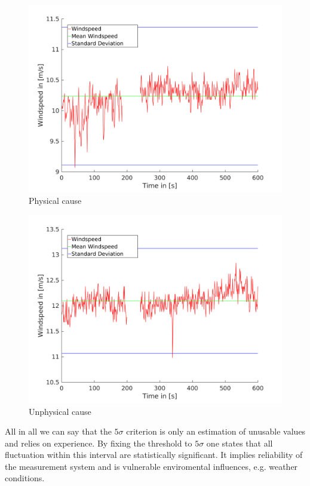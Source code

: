 \documentclass[10pt]{article}
\begin{document}
\begin{figure}[htb!]
  \centering
  \includegraphics[width=1\linewidth]{../Plots/spikesintervall942.png}
  \caption{Physical cause}
    \label{fig:spikePhys}
\end{figure}
\begin{figure}[htb!]
  \centering
  \includegraphics[width=1\linewidth]{../Plots/spikesintervall440.png}
  \caption{Unphysical cause}
  \label{fig:spikeUnphys}
\end{figure}

All in all we can say that the $5\sigma$ criterion is only an estimation of unusable values and relies on experience. By fixing the threshold to $5\sigma$ one states that all fluctuation within this interval are statistically significant. It implies reliability of the measurement system and is vulnerable enviromental influences, e.g. weather conditions.
\end{document}

